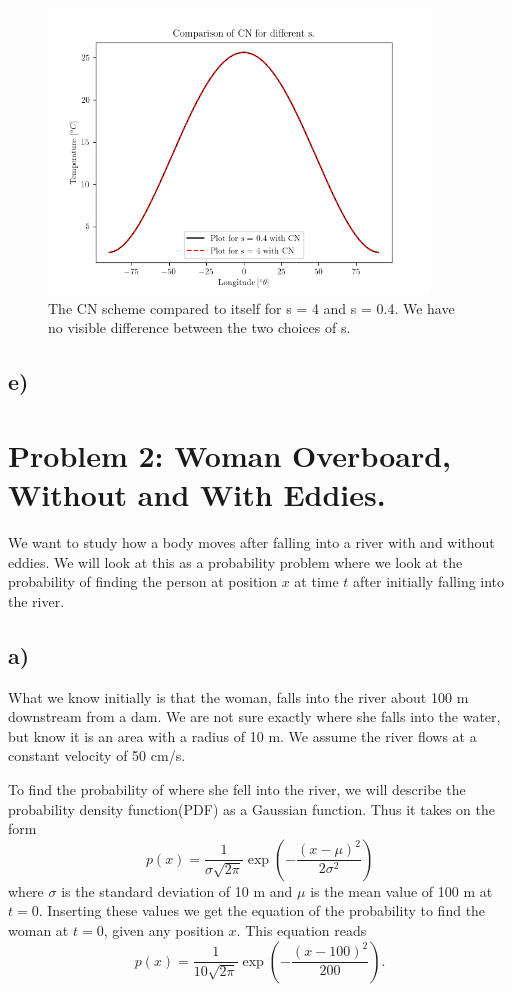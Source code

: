 \documentclass[10pt, a4paper]{amsart}
\begin{document}
\begin{figure}
	\centering\includegraphics[width=0.9\textwidth]{../code/1e2.png}
	\caption{The CN scheme compared to itself for s = 4 and s = 0.4. We have no visible difference between the two choices of s.}
	\label{fig:1e2}
\end{figure}
\newpage
\subsection{e)}

\section{Problem 2: Woman Overboard, Without and With Eddies.}
We want to study how a body moves after falling into a river with and without eddies. We will look at this as a probability problem where we look at the probability of finding the person at position $x$ at time $t$ after initially falling into the river.

\subsection{a)}
What we know initially is that the woman, falls into the river about 100 m downstream from a dam. We are not sure exactly where she falls into the water, but know it is an area with a radius of 10 m. We assume the river flows at a constant velocity of 50 cm/s. 

To find the probability of where she fell into the river, we will describe the probability density function(PDF) as a Gaussian function. Thus it takes on the form 
\begin{equation}
	p(x) = \frac{1}{\sigma\sqrt{2\pi}}\exp\left(-\frac{(x-\mu)^2}{2\sigma^2}\right)
\end{equation}
where $\sigma$ is the standard deviation of 10 m and $\mu$ is the mean value of 100 m at $t=0$. Inserting these values we get the equation of the probability to find the woman at $t=0$, given any position $x$. This equation reads
\begin{equation}\label{PDF_i}
	p(x) = \frac{1}{10\sqrt{2\pi}}\exp\left(-\frac{(x-100)^2}{200}\right). 
\end{equation}
\end{document}
